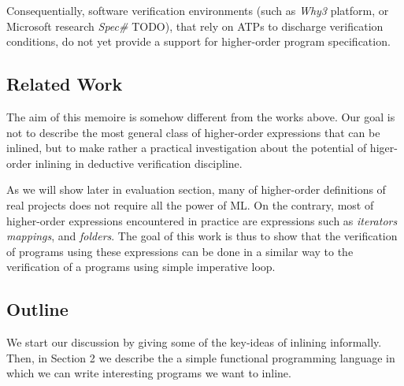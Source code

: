 \documentclass[a4paper,11pt,oneside]{article}
\theoremstyle{plain}
\begin{document}
	Consequentially, software verification environments (such as \textit{Why3} platform, or Microsoft research \textit{Spec\#} TODO), that rely on ATPs to discharge verification conditions, do not yet provide a support for higher-order program specification. \\

%
%
%	
%	

  \subsection{Related Work}	
  
  
	The aim of this memoire is somehow different from the works above. 
	Our goal is not to describe the most general class of higher-order expressions that can be inlined, but to make rather a practical investigation about the potential of higer-order inlining in deductive verification discipline.  
	
	As we will show later in evaluation section, many of higher-order definitions of real projects does not require all the power of ML.
	On the contrary, most of higher-order expressions encountered in practice are expressions such as \textit{iterators} \textit{mappings}, and \textit{folders}.
	The goal of this work is thus to show that the verification of programs using these expressions can be done in a similar way to the verification of a programs using  simple imperative loop. 

	\subsection{Outline}	
	
  We start our discussion by giving some of the key-ideas of inlining informally.
  Then, in Section 2 we describe the a simple functional programming language in which we can write interesting programs we want to inline. 
  
\end{document}

